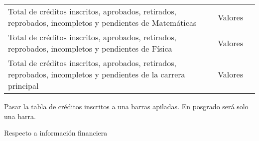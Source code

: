 \begin{table}[H]
\begin{tabular}{p{5cm}p{2.8cm}p{6cm}}
		Total de créditos inscritos, aprobados, retirados, reprobados, incompletos y pendientes de Matemáticas          & Valores                         &                                                                                                                                                                                                                                                                                     \\
		Total de créditos inscritos, aprobados, retirados, reprobados, incompletos y pendientes de Física               & Valores                         &                                                                                                                                                                                                                                                                                     \\
		Total de créditos inscritos, aprobados, retirados, reprobados, incompletos y pendientes de la carrera principal & Valores                         &                                                                                                                                                                                                                                                                                     \\ \hline
	\end{tabular}
\end{table}

Pasar la tabla de créditos inscritos a una barras apiladas.
En posgrado será solo una barra.

Respecto a información financiera



